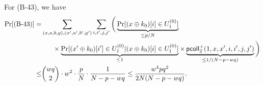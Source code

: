 For (B-43), we have          {\small
	\begin{align*}
	\Pr[\text{(B-43)}]  
	=   &  \sum_{(x,a,b,y),(x',a',b',y')}\sum_{i,i',j,j'}\bigg(\underbrace{\Pr[(x\oplus k_0)[i]\in U_1^{(0)}]}_{\leq p/N}     \\
	& \ \ \ \ \ \times
	\underbrace{\Pr[(x'\oplus k_0)[i']\in U_1^{(0)}|(x\oplus k_0)[i]\in U_1^{(0)}]}_{\leq1}\times\underbrace{\mathsf{pcoll}_2^+(1,x,x',i,i',j,j')}_{\leq1/(N-p-wq)}\bigg)      \\
	\leq  &   {wq\choose 2}\cdot w^2\cdot\frac{p}{N}\cdot\frac{1}{N-p-wq}\leq
	\frac{w^4pq^2}{2N(N-p-wq)}.
	\end{align*}
}%
%





